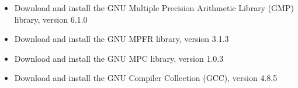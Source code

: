 \documentclass[]{article}
\begin{document}
                                                                                                                            \begin{itemize}
                                                                                                                                \item Download and install the GNU Multiple Precision Arithmetic Library (GMP) library, version 6.1.0
                                                                                                                                    \item Download and install the GNU MPFR library, version 3.1.3
                                                                                                                                        \item Download and install the GNU MPC library, version 1.0.3
                                                                                                                                            \item Download and install the GNU Compiler Collection (GCC), version 4.8.5
                                                                                                                                            \end{itemize}
\end{document}
